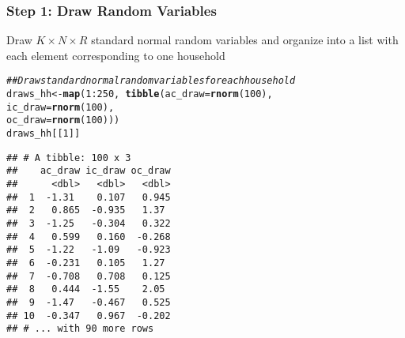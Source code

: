 \documentclass{beamer}\usepackage[]{graphicx}\usepackage[]{xcolor}
\makeatletter
\newcommand{\hlnum}[1]{\textcolor[rgb]{0.686,0.059,0.569}{#1}}%
\newcommand{\hlcom}[1]{\textcolor[rgb]{0.678,0.584,0.686}{\textit{#1}}}%
\newcommand{\hlopt}[1]{\textcolor[rgb]{0,0,0}{#1}}%
\newcommand{\hlstd}[1]{\textcolor[rgb]{0.345,0.345,0.345}{#1}}%
\newcommand{\hlkwb}[1]{\textcolor[rgb]{0.69,0.353,0.396}{#1}}%
\newcommand{\hlkwc}[1]{\textcolor[rgb]{0.333,0.667,0.333}{#1}}%
\newcommand{\hlkwd}[1]{\textcolor[rgb]{0.737,0.353,0.396}{\textbf{#1}}}%
\newenvironment{kframe}{%
 \def\at@end@of@kframe{}%
 \ifinner\ifhmode%
  \def\at@end@of@kframe{\end{minipage}}%
  \begin{minipage}{\columnwidth}%
 \fi\fi%
 \def\FrameCommand##1{\hskip\@totalleftmargin \hskip-\fboxsep
 \colorbox{shadecolor}{##1}\hskip-\fboxsep
     \hskip-\linewidth \hskip-\@totalleftmargin \hskip\columnwidth}%
 \MakeFramed {\advance\hsize-\width
   \@totalleftmargin\z@ \linewidth\hsize
   \@setminipage}}%
 {\par\unskip\endMakeFramed%
 \at@end@of@kframe}
\newenvironment{knitrout}{}{} %
\makeatother
\begin{document}
\begin{frame}[fragile]\frametitle{Step 1: Draw Random Variables}
	Draw $K \times N \times R$ standard normal random variables and organize into a list with each element corresponding to one household \\
    \vspace{1ex}
\begin{knitrout}\scriptsize
{}\color{fgcolor}\begin{kframe}
\begin{alltt}
\hlcom{## Draw standard normal random variables for each household}
\hlstd{draws_hh} \hlkwb{<-} \hlkwd{map}\hlstd{(}\hlnum{1}\hlopt{:}\hlnum{250}\hlstd{,} \hlopt{~} \hlkwd{tibble}\hlstd{(}\hlkwc{ac_draw} \hlstd{=} \hlkwd{rnorm}\hlstd{(}\hlnum{100}\hlstd{),}
                                \hlkwc{ic_draw} \hlstd{=} \hlkwd{rnorm}\hlstd{(}\hlnum{100}\hlstd{),}
                                \hlkwc{oc_draw} \hlstd{=} \hlkwd{rnorm}\hlstd{(}\hlnum{100}\hlstd{)))}
\hlstd{draws_hh[[}\hlnum{1}\hlstd{]]}
\end{alltt}
\begin{verbatim}
## # A tibble: 100 x 3
##    ac_draw ic_draw oc_draw
##      <dbl>   <dbl>   <dbl>
##  1  -1.31    0.107   0.945
##  2   0.865  -0.935   1.37 
##  3  -1.25   -0.304   0.322
##  4   0.599   0.160  -0.268
##  5  -1.22   -1.09   -0.923
##  6  -0.231   0.105   1.27 
##  7  -0.708   0.708   0.125
##  8   0.444  -1.55    2.05 
##  9  -1.47   -0.467   0.525
## 10  -0.347   0.967  -0.202
## # ... with 90 more rows
\end{verbatim}
\end{kframe}
\end{knitrout}
\end{frame}
\end{document}
